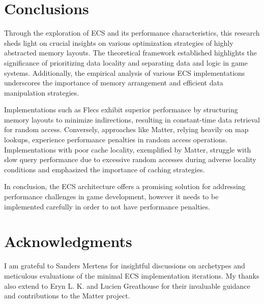 \documentclass[openany, amssymb, psamsfonts]{amsart}
\theoremstyle{definition}
\numberwithin{equation}{section}
\begin{document}
\section{Conclusions}
Through the exploration of ECS and its performance characteristics, this research sheds light 
on crucial insights on various optimization strategies of highly abstracted memory layouts. 
The theoretical framework established highlights the significance of prioritizing data locality 
and separating data and logic in game systems. Additionally, the empirical analysis of various 
ECS implementations underscores the importance of memory arrangement and efficient data 
manipulation strategies.

Implementations such as Flecs exhibit superior performance by 
structuring memory layouts to minimize indirections, resulting in constant-time data 
retrieval for random access. Conversely, approaches like Matter, relying heavily on map lookups, 
experience performance penalties in random access operations. Implementations with poor cache 
locality, exemplified by Matter, struggle with slow query performance due to excessive random 
accesses during adverse locality conditions and emphasized the importance of caching strategies.

In conclusion, the ECS architecture offers a promising solution for addressing performance 
challenges in game development, however it needs to be implemented carefully in order to not
have performance penalties.

\section{Acknowledgments}  
I am grateful to Sanders Mertens for insightful discussions on archetypes and 
meticulous evaluations of the minimal ECS implementation iterations. 
My thanks also extend to Eryn L. K. and Lucien Greathouse for their invaluable 
guidance and contributions to the Matter project.
\end{document}
